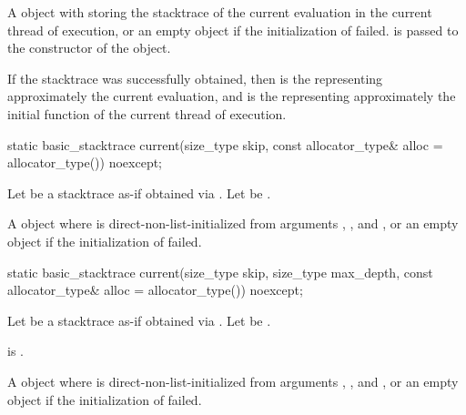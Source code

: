 \begin{itemdescr}
\pnum
\returns
A  object
with  storing
the stacktrace of the current evaluation in the current thread of execution, or
an empty  object
if the initialization of  failed.
 is passed to the constructor of the  object.

\begin{note}
If the stacktrace was successfully obtained,
then  is the 
representing approximately the current evaluation, and
 is the 
representing approximately the initial function of
the current thread of execution.
\end{note}
\end{itemdescr}

%
\begin{itemdecl}
static basic_stacktrace current(size_type skip,
                                const allocator_type& alloc = allocator_type()) noexcept;
\end{itemdecl}

\begin{itemdescr}
\pnum
Let  be a stacktrace
as-if obtained via .
Let  be .

\pnum
\returns
A  object
where  is direct-non-list-initialized from arguments
, , and ,
or an empty  object
if the initialization of  failed.
\end{itemdescr}

%
\begin{itemdecl}
static basic_stacktrace current(size_type skip, size_type max_depth,
                                const allocator_type& alloc = allocator_type()) noexcept;
\end{itemdecl}

\begin{itemdescr}
\pnum
Let  be a stacktrace
as-if obtained via .
Let  be .

\pnum
\expects
{} is .

\pnum
\returns
A  object
where  is direct-non-list-initialized from arguments
, ,
and ,
or an empty  object
if the initialization of  failed.
\end{itemdescr}

